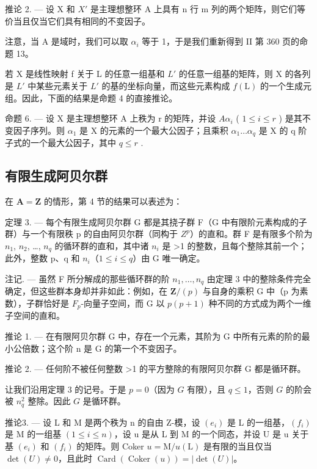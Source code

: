 推论 2. --- 设 X 和 \(X'\) 是主理想整环 A 上具有 n 行 m 列的两个矩阵，则它们等价当且仅当它们具有相同的不变因子。

注意，当 A 是域时，我们可以取 \(\alpha_{i}\) 等于 1，于是我们重新得到 II 第 360 页的命题 13。

若 X 是线性映射 f 关于 L 的任意一组基和 \(L'\) 的任意一组基的矩阵，则 X 的各列是 \(L'\) 中某些元素关于 \(L'\) 的基的坐标向量，而这些元素构成 \(f(\mathrm{L})\) 的一个生成元组。因此，下面的结果是命题 4 的直接推论。

命题 6. --- 设 X 是主理想整环 A 上秩为 r 的矩阵，并设 \(A\alpha_{i}\) ( \(1 \leqslant i \leqslant r\) ) 是其不变因子序列。则 \(\alpha_{1}\) 是 X 的元素的一个最大公因子；且乘积 \(\alpha_{1} \ldots \alpha_{q}\) 是 X 的 q 阶子式的一个最大公因子，其中 \(q \leqslant r\) .

\subsection{有限生成阿贝尔群}

在 \(\mathbf{A} = \mathbf{Z}\) 的情形，第 4 节的结果可以表述为：

定理 3. --- 每个有限生成阿贝尔群 G 都是其挠子群 F（G 中有限阶元素构成的子群）与一个有限秩 p 的自由阿贝尔群（同构于 \(Z^{p}\)）的直和。群 F 是有限多个阶为 \(n_{1}\), \(n_{2}\), \ldots, \(n_{q}\) 的循环群的直和，其中诸 \(n_{i}\) 是 \textgreater1 的整数，且每个整除其前一个；此外，整数 p、q 和 \(n_{i}\)（\(1 \leq i \leq q\)）由 G 唯一确定。

注记. --- 虽然 F 所分解成的那些循环群的阶 \(n_{1}, \ldots, n_{q}\) 由定理 3 中的整除条件完全确定，但这些群本身却并非如此：例如，在 \(\mathbf{Z}/(p)\) 与自身的乘积 G 中（p 为素数），子群恰好是 \(F_{p}\)-向量子空间，而 G 以 \(p(p+1)\) 种不同的方式成为两个一维子空间的直和。

推论 1. --- 在有限阿贝尔群 G 中，存在一个元素，其阶为 G 中所有元素的阶的最小公倍数；这个阶 n 是 G 的第一个不变因子。

推论 2. --- 任何阶不被任何整数 \textgreater1 的平方整除的有限阿贝尔群 G 都是循环群。

让我们沿用定理 3 的记号。于是 \(p = 0\)（因为 \(G\) 有限），且 \(q \leqslant 1\)，否则 \(G\) 的阶会被 \(n_q^2\) 整除。因此 \(G\) 是循环群。

推论3. --- 设 L 和 M 是两个秩为 n 的自由 Z-模，设 \((e_{i})\) 是 L 的一组基，\((f_{i})\) 是 M 的一组基 \((1 \leqslant i \leqslant n)\)，设 u 是从 L 到 M 的一个同态，并设 U 是 u 关于基 \((e_{i})\) 和 \((f_{i})\) 的矩阵。则 Coker \(u = \mathrm{M}/u(\mathrm{L})\) 是有限的当且仅当 \(\det(U) \neq 0\)，且此时 \(\operatorname{Card}(\operatorname{Coker}(u)) = |\det(U)|\)。

